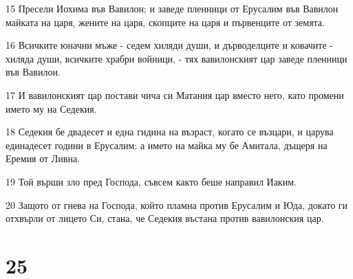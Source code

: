 \par 15 Пресели Иохима във Вавилон; и заведе пленници от Ерусалим във Вавилон майката на царя, жените на царя, скопците на царя и първенците от земята.
\par 16 Всичките юначни мъже - седем хиляди души, и дърводелците и ковачите - хиляда души, всичките храбри войници, - тях вавилонският цар заведе пленници във Вавилон.
\par 17 И вавилонският цар постави чича си Матания цар вместо него, като промени името му на Седекия.
\par 18 Седекия бе двадесет и една гидина на възраст, когато се възцари, и царува единадесет години в Ерусалим; а името на майка му бе Амитала, дъщеря на Еремия от Ливна.
\par 19 Той върши зло пред Господа, съвсем както беше направил Иаким.
\par 20 Защото от гнева на Господа, който пламна против Ерусалим и Юда, докато ги отхвърли от лицето Си, стана, че Седекия въстана против вавилонския цар.

\chapter{25}

